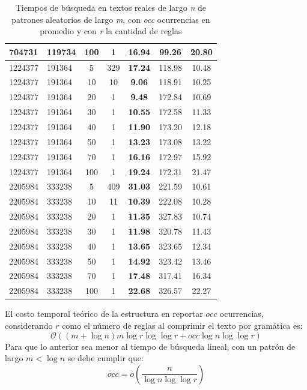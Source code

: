 \begin{table}[h!]
\begin{tabular}{|l|l|c|c|c|c|c|}
704731 & 119734 & 100 & 1 & \textbf{16.94} & 99.26 & 20.80 \\ \hline
1224377 & 191364 & 5 & 329 & \textbf{17.24 }& 118.98 & 10.48 \\
1224377 & 191364 & 10 & 10 & \textbf{9.06} & 118.91 & 10.25 \\
1224377 & 191364 & 20 & 1 & \textbf{9.48} & 172.84 & 10.69 \\
1224377 & 191364 & 30 & 1 & \textbf{10.55} & 172.58 & 11.33 \\
1224377 & 191364 & 40 & 1 & \textbf{11.90} & 173.20 & 12.18 \\
1224377 & 191364 & 50 & 1 & \textbf{13.23} & 173.08 & 13.22 \\
1224377 & 191364 & 70 & 1 & \textbf{16.16} & 172.97 & 15.92 \\
1224377 & 191364 & 100 & 1 & \textbf{19.24} & 172.31 & 21.47 \\ \hline
2205984 & 333238 & 5 & 409 & \textbf{31.03} & 221.59 & 10.61 \\
2205984 & 333238 & 10 & 11 & \textbf{10.39} & 222.08 & 10.28 \\
2205984 & 333238 & 20 & 1 & \textbf{11.35} & 327.83 & 10.74 \\
2205984 & 333238 & 30 & 1 & \textbf{11.98 }& 320.78 & 11.43 \\
2205984 & 333238 & 40 & 1 & \textbf{13.65 }& 323.65 & 12.34 \\
2205984 & 333238 & 50 & 1 & \textbf{14.92} & 323.42 & 13.46 \\
2205984 & 333238 & 70 & 1 & \textbf{17.48} & 317.41 & 16.34 \\
2205984 & 333238 & 100 & 1 & \textbf{22.68} & 326.57 & 22.27 \\ \hline

\end{tabular}
\caption{Tiempos de búsqueda en textos reales de largo \textit{n} de patrones aleatorios de largo \textit{m}, con \textit{occ} ocurrencias en promedio y con \textit{r} la cantidad de reglas}
\label{tab:runtimes}
\end{table}

El costo temporal teórico de la estructura en reportar $occ$ ocurrencias, considerando $r$ como el número de reglas al comprimir el texto por gramática es:
\[
\mathcal{O}( (m + \log{n}) m \log{r} \log{\log{r}} + \textit{occ} \log{n} \log{\log{r}}  )
\]
Para que lo anterior sea menor al tiempo de búsqueda lineal, con un patrón de largo $m < \log {n}$ se debe cumplir que:
\[occ = o ( \frac{n}{ \log n \log \log r} ) \]

